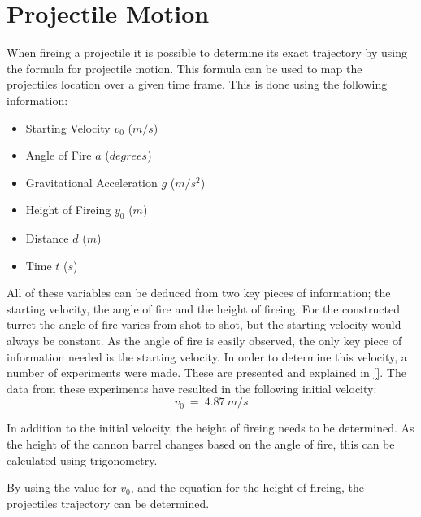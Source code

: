 \section{Projectile Motion}
When fireing a projectile it is possible to determine its exact trajectory by
using the formula for projectile motion. This formula can be used to map the
projectiles location over a given time frame. This is done using the following
information:
\begin{itemize}
  \item Starting Velocity $v_0$ ($m/s$)
  \item Angle of Fire $a$ ($degrees$)
  \item Gravitational Acceleration $g$ ($m/s^2$)
  \item Height of Fireing $y_0$ ($m$)
  \item Distance $d$ ($m$)
  \item Time $t$ ($s$)
\end{itemize}

All of these variables can be deduced from two key pieces of information; the
starting velocity, the angle of fire and the height of fireing. For the
constructed turret the angle of fire varies from shot to shot, but the starting
velocity would always be constant. As the angle of fire is easily observed, the
only key piece of information needed is the starting velocity. In order to
determine this velocity, a number of experiments were made. These are presented
and explained in \autoref{}. The data from these experiments have resulted in
the following initial velocity:\nl
\begin{equation}
v_0\ =\ 4.87\ m/s
\end{equation}

In addition to the initial velocity, the height of fireing needs to be
determined. As the height of the cannon barrel changes based on the angle of
fire, this can be calculated using trigonometry.

By using the value for $v_0$, and the equation for the height of fireing, the
projectiles trajectory can be determined.



